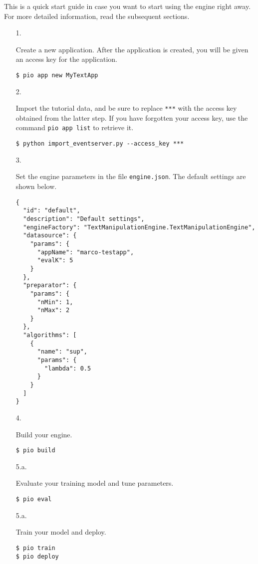 \documentclass[a4paper,12pt]{article}
\renewcommand{\tt}[1]{\texttt{#1}}
\newcommand{\3}{\left}
\newcommand{\4}{\right}
\renewcommand{\-}[1]{{}^{-#1}}
\begin{document}
This is a quick start guide in case you want to start using the engine right away. For more detailed information, read the subsequent sections.

\begin{itemize}
\item[1.]{Create a new application. After the application is created, you will be given an access key for the application.
\begin{verbatim}
$ pio app new MyTextApp
\end{verbatim}}

\item[2.]{Import the tutorial data, and be sure to replace \tt{***} with the access key obtained from the latter step. If you have forgotten your access key, use the command \tt{pio app list} to retrieve it.
\begin{verbatim}
$ python import_eventserver.py --access_key ***
\end{verbatim}}

\item[3.]{Set the engine parameters in the file \tt{engine.json}. The default settings are shown below.

\break

\begin{verbatim}
{
  "id": "default",
  "description": "Default settings",
  "engineFactory": "TextManipulationEngine.TextManipulationEngine",
  "datasource": {
    "params": {
      "appName": "marco-testapp",
      "evalK": 5
    }
  },
  "preparator": {
    "params": {
      "nMin": 1,
      "nMax": 2
    }
  },
  "algorithms": [
    {
      "name": "sup",
      "params": {
        "lambda": 0.5
      }
    }
  ]
}
\end{verbatim}}

\item[4.]{Build your engine.
\begin{verbatim}
$ pio build
\end{verbatim}}

\item[5.a.]{Evaluate your training model and tune parameters.
\begin{verbatim}
$ pio eval
\end{verbatim}}

\item[5.a.]{Train your model and deploy.
\begin{verbatim}
$ pio train
$ pio deploy
\end{verbatim}}

\end{itemize}
\end{document}

